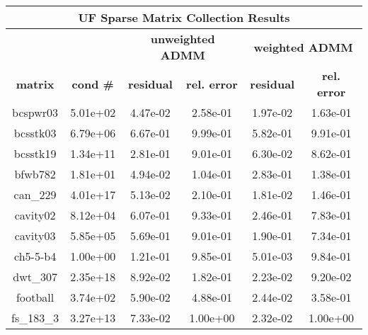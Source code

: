 \documentclass[11pt]{article}          %
\begin{document}
\begin{table}[!t]
\centering
\small
\begin{tabular}{|c|c|c|c|c|c|}
\hline
\multicolumn{6}{|c|}{\textbf{UF Sparse Matrix Collection Results}}
\\
\hline
& & \multicolumn{2}{|c|}{\textbf{unweighted ADMM}} & \multicolumn{2}{c|}{\textbf{weighted ADMM}}
\\
\hline
\textbf{matrix}        & \textbf{cond \#}     & \textbf{residual}       & \textbf{rel. error}     & \textbf{residual}      & \textbf{rel. error}   \\ \hline
bcspwr03              & 5.01e+02             & 4.47e-02                 & 2.58e-01                 & 1.97e-02             & 1.63e-01          \\ \hline
bcsstk03              & 6.79e+06             & 6.67e-01                 & 9.99e-01              & 5.82e-01             & 9.91e-01             \\ \hline
bcsstk19              & 1.34e+11             & 2.81e-01                 & 9.01e-01              & 6.30e-02             & 8.62e-01             \\ \hline
bfwb782               & 1.81e+01             & 4.94e-02                 & 1.04e-01              & 2.83e-01             & 1.38e-01             \\ \hline
can\_229              & 4.01e+17             & 5.13e-02                 & 2.10e-01              & 1.81e-02             & 1.46e-01             \\ \hline
cavity02              & 8.12e+04             & 6.07e-01                 & 9.33e-01              & 2.46e-01             & 7.83e-01             \\ \hline
cavity03              & 5.85e+05             & 5.69e-01                 & 9.01e-01              & 1.90e-01             & 7.34e-01             \\ \hline
ch5-5-b4              & 1.00e+00             & 1.21e-01                 & 9.85e-01              & 5.01e-03             & 9.84e-01             \\ \hline
dwt\_307              & 2.35e+18             & 8.92e-02                 & 1.82e-01              & 2.23e-02             & 9.20e-02             \\ \hline
football              & 3.74e+02             & 5.90e-02                 & 4.88e-01              & 2.44e-02             & 3.58e-01             \\ \hline
fs\_183\_3            & 3.27e+13             & 7.33e-02                 & 1.00e+00              & 2.32e-02             & 1.00e+00             \\ \hline

\end{tabular}
\end{table}
\end{document}

